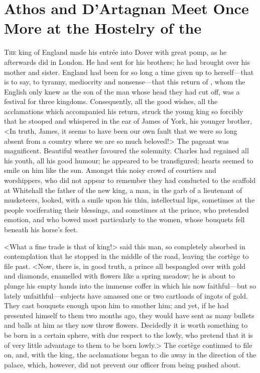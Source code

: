 \chapter{Athos and D'Artagnan Meet Once More at the Hostelry of the }

\lettrine{T}{he} king of England made his entrée into Dover with great pomp, as he afterwards did in London. He had sent for his brothers; he had brought over his mother and sister. England had been for so long a time given up to herself—that is to say, to tyranny, mediocrity and nonsense—that this return of , whom the English only knew as the son of the man whose head they had cut off, was a festival for three kingdoms. Consequently, all the good wishes, all the acclamations which accompanied his return, struck the young king so forcibly that he stooped and whispered in the ear of James of York, his younger brother, <In truth, James, it seems to have been our own fault that we were so long absent from a country where we are so much beloved!> The pageant was magnificent. Beautiful weather favoured the solemnity. Charles had regained all his youth, all his good humour; he appeared to be transfigured; hearts seemed to smile on him like the sun. Amongst this noisy crowd of courtiers and worshippers, who did not appear to remember they had conducted to the scaffold at Whitehall the father of the new king, a man, in the garb of a lieutenant of musketeers, looked, with a smile upon his thin, intellectual lips, sometimes at the people vociferating their blessings, and sometimes at the prince, who pretended emotion, and who bowed most particularly to the women, whose bouquets fell beneath his horse's feet.

<What a fine trade is that of king!> said this man, so completely absorbed in contemplation that he stopped in the middle of the road, leaving the cortège to file past. <Now, there is, in good truth, a prince all bespangled over with gold and diamonds, enamelled with flowers like a spring meadow; he is about to plunge his empty hands into the immense coffer in which his now faithful—but so lately unfaithful—subjects have amassed one or two cartloads of ingots of gold. They cast bouquets enough upon him to smother him; and yet, if he had presented himself to them two months ago, they would have sent as many bullets and balls at him as they now throw flowers. Decidedly it is worth something to be born in a certain sphere, with due respect to the lowly, who pretend that it is of very little advantage to them to be born lowly.> The cortège continued to file on, and, with the king, the acclamations began to die away in the direction of the palace, which, however, did not prevent our officer from being pushed about.

